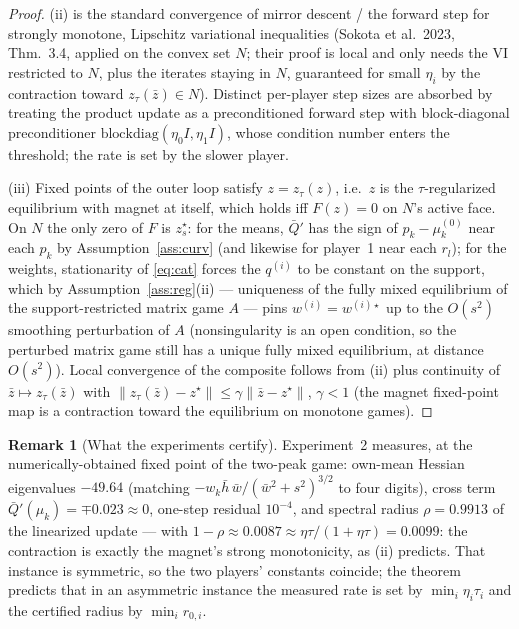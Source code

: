\documentclass[11pt]{article}
\theoremstyle{definition}
\newtheorem{remark}{Remark}
\begin{document}
\begin{proof}
(ii) is the standard convergence of mirror descent / the forward step for
strongly monotone, Lipschitz variational inequalities (Sokota et al.\ 2023,
Thm.~3.4, applied on the convex set $N$; their proof is local and only needs
the VI restricted to $N$, plus the iterates staying in $N$, guaranteed for
small $\eta_i$ by the contraction toward $z_\tau(\bar z) \in N$). Distinct
per-player step sizes are absorbed by treating the product update as a
preconditioned forward step with block-diagonal preconditioner
$\mathrm{blockdiag}(\eta_0 I, \eta_1 I)$, whose condition number enters the
threshold; the rate is set by the slower player.

(iii) Fixed points of the outer loop satisfy $z = z_\tau(z)$, i.e.\ $z$ is the
$\tau$-regularized equilibrium with magnet at itself, which holds iff $F(z) =
0$ on $N$'s active face. On $N$ the only zero of $F$ is $z_s^\star$: for the
means, $\bar Q'$ has the sign of $p_k - \mu^{(0)}_k$ near each $p_k$ by
Assumption~\ref{ass:curv} (and likewise for player~1 near each $r_l$); for the
weights, stationarity of \eqref{eq:cat} forces the $q^{(i)}$ to be constant on
the support, which by Assumption~\ref{ass:reg}(ii) --- uniqueness of the fully
mixed equilibrium of the support-restricted matrix game $A$ --- pins
$w^{(i)} = w^{(i)\star}$ up to the $O(s^2)$ smoothing perturbation of $A$
(nonsingularity is an open condition, so the perturbed matrix game still has a
unique fully mixed equilibrium, at distance $O(s^2)$). Local convergence of the
composite follows from (ii) plus continuity of $\bar z \mapsto z_\tau(\bar z)$
with $\|z_\tau(\bar z) - z^\star\| \le \gamma\|\bar z - z^\star\|$,
$\gamma < 1$ (the magnet fixed-point map is a contraction toward the
equilibrium on monotone games).
\end{proof}

\begin{remark}[What the experiments certify]
Experiment~2 measures, at the numerically-obtained fixed point of the two-peak
game: own-mean Hessian eigenvalues $-49.64$ (matching $-w_k \bar h\,
\bar w/(\bar w^2+s^2)^{3/2}$ to four digits), cross term
$\bar Q'(\mu_k) = \mp 0.023 \approx 0$, one-step residual $10^{-4}$, and
spectral radius $\rho = 0.9913$ of the linearized update --- with
$1 - \rho \approx 0.0087 \approx \eta\tau/(1 + \eta\tau) = 0.0099$: the
contraction is exactly the magnet's strong monotonicity, as (ii) predicts. That
instance is symmetric, so the two players' constants coincide; the theorem
predicts that in an asymmetric instance the measured rate is set by
$\min_i \eta_i \tau_i$ and the certified radius by $\min_i r_{0,i}$.
\end{remark}
\end{document}
